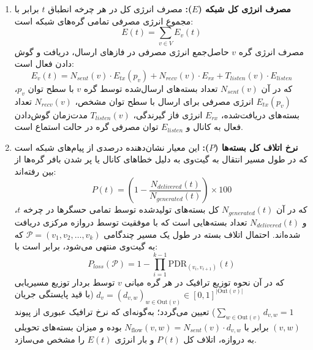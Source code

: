 \documentclass[oneside,openany,phd]{TMU-Thesis}
\begin{document}
\begin{enumerate}
    \item \textbf{مصرف انرژی کل شبکه ($E$):}
    مصرف انرژی کل در هر چرخه انطباق $t$ برابر با مجموع انرژی مصرفی تمامی گره‌های شبکه است:
    \begin{equation}
        E(t) = \sum_{v \in V} E_v(t)
    \end{equation}
    مصرف انرژی گره $v$ حاصل‌جمع انرژی مصرفی در فازهای ارسال، دریافت و گوش دادن فعال است:
    \begin{equation}
        E_v(t) = N_{sent}(v) \cdot E_{tx}(p_v) + N_{recv}(v) \cdot E_{rx} + T_{listen}(v) \cdot E_{listen}
    \end{equation}
    که در آن $N_{sent}(v)$ تعداد بسته‌های ارسال‌شده توسط گره $v$ با سطح توان $p_v$، $E_{tx}(p_v)$ انرژی مصرفی برای ارسال با سطح توان مشخص، $N_{recv}(v)$ تعداد بسته‌های دریافت‌شده، $E_{rx}$ انرژی فاز گیرندگی، $T_{listen}(v)$ مدت‌زمان گوش‌دادن فعال به کانال و $E_{listen}$ توان مصرفی گره در حالت استماع است.
    
    \item \textbf{نرخ اتلاف کل بسته‌ها ($P$):}
    این معیار نشان‌دهنده درصدی از پیام‌های شبکه است که در طول مسیر انتقال به گیت‌وی به دلیل خطاهای کانال یا پر شدن بافر گره‌ها از بین رفته‌اند:
    \begin{equation}\label{eq:P_total}
        P(t) = \left( 1 - \frac{N_{delivered}(t)}{N_{generated}(t)} \right) \times 100
    \end{equation}
    که در آن $N_{generated}(t)$ کل بسته‌های تولید‌شده توسط تمامی حسگرها در چرخه $t$، و $N_{delivered}(t)$ تعداد بسته‌هایی است که با موفقیت توسط دروازه مرکزی دریافت شده‌اند. احتمال اتلاف بسته در طول یک مسیر چندگامی $\mathcal{P} = (v_1, v_2, \ldots, v_k)$ که به گیت‌وی منتهی می‌شود، برابر است با:
    \begin{equation}\label{eq:P_loss_path}
        P_{loss}(\mathcal{P}) = 1 - \prod_{i=1}^{k-1} \text{PDR}_{(v_i, v_{i+1})}(t)
    \end{equation}
    که در آن نحوه توزیع ترافیک در هر گره میانی $v$ توسط بردار توزیع مسیریابی $d_v = (d_{v,w})_{w \in \text{Out}(v)} \in [0, 1]^{|\text{Out}(v)|}$ (با قید پایستگی جریان $\sum_{w \in \text{Out}(v)} d_{v,w} = 1$) تعیین می‌گردد؛ به‌گونه‌ای که نرخ ترافیک عبوری از پیوند $(v, w)$ برابر با $N_{\text{flow}}(v, w) = N_{sent}(v) \cdot d_{v,w}$ بوده و میزان بسته‌های تحویلی به دروازه، اتلاف کل $P(t)$ و بار انرژی $E(t)$ را مشخص می‌سازد.
    

\end{enumerate}
\end{document}
